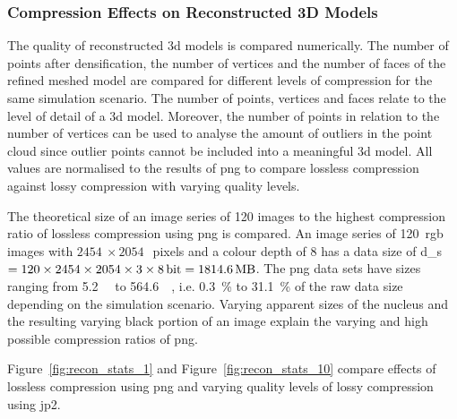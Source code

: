\subsubsection{Compression Effects on Reconstructed 3D Models}
The quality of  reconstructed \gls{3d} models is compared numerically. The number of points after densification, the number of vertices and the number of faces of the refined meshed model are compared for different levels of compression for the same simulation scenario. The number of points, vertices and faces relate to the level of detail of a \gls{3d} model. Moreover, the number of points in relation to the number of vertices can be used to analyse the amount of outliers in the point cloud since outlier points cannot be included into a meaningful \gls{3d} model. All values are normalised to the results of \gls{png} to compare lossless compression against lossy compression with varying quality levels.

The theoretical size of an image series of \SI{120}{} images to the highest compression ratio of lossless compression using \gls{png} is compared. An image series of \SI{120}{}~\gls{rgb} images with $\SI{2454}{} \times \SI{2054}{}$~pixels and a colour depth of \SI{8}{\bit} has a data size of \gls{d_s}$ = 120 \times 2454 \times 2054 \times 3 \times \SI{8}{\bit} = \SI{1814.6}{\mega\byte}$. The \gls{png} data sets have sizes ranging from \SI{5.2}{\mega\byte} to \SI{564.6}{\mega\byte}, i.e. \SI{0.3}{\percent} to \SI{31.1}{\percent} of the raw data size depending on the simulation scenario. Varying apparent sizes of the nucleus and the resulting varying black portion of an image explain the varying and high possible compression ratios of \gls{png}.

Figure~\ref{fig:recon_stats_1} and Figure~\ref{fig:recon_stats_10} compare effects of lossless compression using \gls{png} and varying quality levels of lossy compression using \gls{jp2}.

